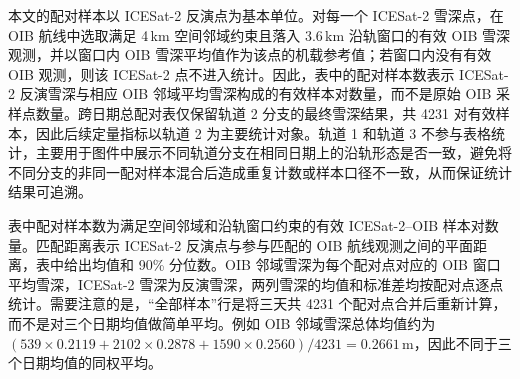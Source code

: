本文的配对样本以 ICESat-2 反演点为基本单位。对每一个 ICESat-2 雪深点，在 OIB 航线中选取满足 4\,km 空间邻域约束且落入 3.6\,km 沿轨窗口的有效 OIB 雪深观测，并以窗口内 OIB 雪深平均值作为该点的机载参考值；若窗口内没有有效 OIB 观测，则该 ICESat-2 点不进入统计。因此，表中的配对样本数表示 ICESat-2 反演雪深与相应 OIB 邻域平均雪深构成的有效样本对数量，而不是原始 OIB 采样点数量。跨日期总配对表仅保留轨道 2 分支的最终雪深结果，共 4231 对有效样本，因此后续定量指标以轨道 2 为主要统计对象。轨道 1 和轨道 3 不参与表格统计，主要用于图件中展示不同轨道分支在相同日期上的沿轨形态是否一致，避免将不同分支的非同一配对样本混合后造成重复计数或样本口径不一致，从而保证统计结果可追溯。

\begin{table}[htbp]
    \centering
    \caption{\label{tab:data-summary}OIB 验证样本数据对齐与雪深背景统计}
    \small
    \setlength{\tabcolsep}{4pt}
    \renewcommand{\arraystretch}{1.18}

\end{table}

表中配对样本数为满足空间邻域和沿轨窗口约束的有效 ICESat-2--OIB 样本对数量。匹配距离表示 ICESat-2 反演点与参与匹配的 OIB 航线观测之间的平面距离，表中给出均值和 90\% 分位数。OIB 邻域雪深为每个配对点对应的 OIB 窗口平均雪深，ICESat-2 雪深为反演雪深，两列雪深的均值和标准差均按配对点逐点统计。需要注意的是，``全部样本''行是将三天共 4231 个配对点合并后重新计算，而不是对三个日期均值做简单平均。例如 OIB 邻域雪深总体均值约为 \((539\times0.2119+2102\times0.2878+1590\times0.2560)/4231=0.2661\)\,m，因此不同于三个日期均值的同权平均。

